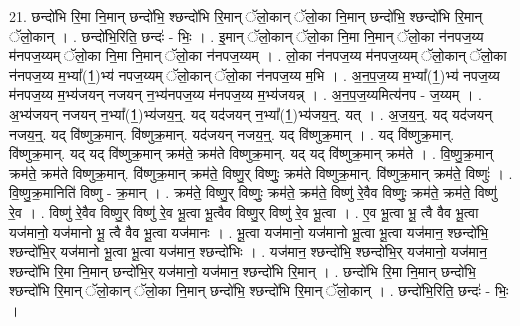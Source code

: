 \documentclass[17pt]{extarticle}
\begin{document}
21. छन्दो॑भि रि॒मा नि॒मान् छन्दो॑भि॒ श्छन्दो॑भि रि॒मान् ॅलो॒कान् ॅलो॒का नि॒मान् छन्दो॑भि॒ श्छन्दो॑भि रि॒मान् ॅलो॒कान् । . छन्दो॑भि॒रिति॒ छन्दः॑ - भिः॒ । . इ॒मान् ॅलो॒कान् ॅलो॒का नि॒मा नि॒मान् ॅलो॒का न॑नपज॒य्य म॑नपज॒य्यम् ॅलो॒का नि॒मा नि॒मान् ॅलो॒का न॑नपज॒य्यम् । . लो॒का न॑नपज॒य्य म॑नपज॒य्यम् ॅलो॒कान् ॅलो॒का न॑नपज॒य्य म॒भ्या᳚(1॒)भ्य॑ नपज॒य्यम् ॅलो॒कान् ॅलो॒का न॑नपज॒य्य म॒भि । . अ॒न॒प॒ज॒य्य म॒भ्या᳚(1॒)भ्य॑ नपज॒य्य म॑नपज॒य्य म॒भ्य॑जयन् नजयन् न॒भ्य॑नपज॒य्य म॑नपज॒य्य म॒भ्य॑जयन्न् । . अ॒न॒प॒ज॒य्यमित्य॑नप - ज॒य्यम् । . अ॒भ्य॑जयन् नजयन् न॒भ्या᳚(1॒)भ्य॑जय॒न्॒. यद् यद॑जयन् न॒भ्या᳚(1॒)भ्य॑जय॒न्॒. यत् । . अ॒ज॒य॒न्॒. यद् यद॑जयन् नजय॒न्॒. यद् वि॑ष्णुक्र॒मान्. वि॑ष्णुक्र॒मान्. यद॑जयन् नजय॒न्॒. यद् वि॑ष्णुक्र॒मान् । . यद् वि॑ष्णुक्र॒मान्. वि॑ष्णुक्र॒मान्. यद् यद् वि॑ष्णुक्र॒मान् क्रम॑ते॒ क्रम॑ते विष्णुक्र॒मान्. यद् यद् 
वि॑ष्णुक्र॒मान् क्रम॑ते । . वि॒ष्णु॒क्र॒मान् क्रम॑ते॒ क्रम॑ते विष्णुक्र॒मान्. वि॑ष्णुक्र॒मान् क्रम॑ते॒ विष्णु॒र् विष्णुः॒ क्रम॑ते विष्णुक्र॒मान्. वि॑ष्णुक्र॒मान् क्रम॑ते॒ विष्णुः॑ । . वि॒ष्णु॒क्र॒मानिति॑ विष्णु - क्र॒मान् । . क्रम॑ते॒ विष्णु॒र् विष्णुः॒ क्रम॑ते॒ क्रम॑ते॒ विष्णु॑ रे॒वैव विष्णुः॒ क्रम॑ते॒ क्रम॑ते॒ विष्णु॑ रे॒व । . विष्णु॑ रे॒वैव विष्णु॒र् विष्णु॑ रे॒व भू॒त्वा भू॒त्वैव विष्णु॒र् विष्णु॑ रे॒व भू॒त्वा । . ए॒व भू॒त्वा भू॒ त्वै वैव भू॒त्वा यज॑मानो॒ यज॑मानो भू॒ त्वै वैव भू॒त्वा यज॑मानः । . भू॒त्वा यज॑मानो॒ यज॑मानो भू॒त्वा भू॒त्वा यज॑मान॒ श्छन्दो॑भि॒ श्छन्दो॑भि॒र् यज॑मानो भू॒त्वा भू॒त्वा यज॑मान॒ श्छन्दो॑भिः । . यज॑मान॒ श्छन्दो॑भि॒ श्छन्दो॑भि॒र् यज॑मानो॒ यज॑मान॒ श्छन्दो॑भि रि॒मा नि॒मान् छन्दो॑भि॒र् यज॑मानो॒ यज॑मान॒ श्छन्दो॑भि रि॒मान् । . छन्दो॑भि रि॒मा नि॒मान् छन्दो॑भि॒ श्छन्दो॑भि रि॒मान् ॅलो॒कान् ॅलो॒का नि॒मान् छन्दो॑भि॒ श्छन्दो॑भि रि॒मान् ॅलो॒कान् । . छन्दो॑भि॒रिति॒ छन्दः॑ - भिः॒ । \newline
\end{document}
